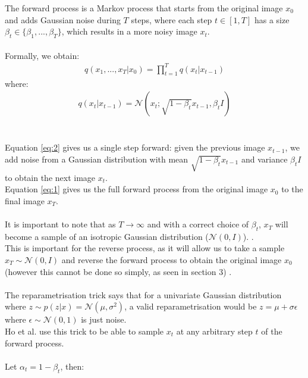 \documentclass{article}
\begin{document}
The forward process is a Markov process that starts from the original image $x_0$ and adds Gaussian noise during $T$ steps, where each step $t \in \left[1, T\right]$ has a size $\beta_t \in \{ \beta_1, ..., \beta_T \}$, which results in a more noisy image $x_t$. \cite{ho2020denoising}
\\\\
Formally, we obtain:
\begin{align}
  q\left(x_{1},..., x_{T} | x_0\right) = \prod_{t = 1}^T{q\left(x_t | x_{t - 1}\right)} \label{eq:1}
\end{align}
where:
\begin{align}
  q\left(x_t | x_{t-1}\right) = \mathcal{N}\left(x_t; \sqrt{1 - \beta_t}x_{t-1}, \beta_t I\right) \label{eq:2}
\end{align}
\\\\
Equation \ref{eq:2} gives us a single step forward: given the previous image $x_{t-1}$, we add noise from a Gaussian distribution with mean $\sqrt{1 - \beta_t}x_{t-1}$ and variance $\beta_t I$ to obtain the next image $x_t$. \\
Equation \ref{eq:1} gives us the full forward process from the original image $x_0$ to the final image $x_T$.
\\\\
It is important to note that as $T \rightarrow \infty$ and with a correct choice of $\beta_t$,  $x_T$ will become a sample of an isotropic Gaussian distribution ($\mathcal{N}\left(0, I\right)$). \cite{nichol2021improved} \cite{sohldickstein2015deep}. \\
This is important for the reverse process, as it will allow us to take a sample $x_T \sim \mathcal{N}\left(0, I\right)$ and reverse the forward process to obtain the original image $x_0$ (however this cannot be done so simply, as seen in section 3) \cite{nichol2021improved}.
\\\\
The reparametrisation trick says that for a univariate Gaussian distribution where $z \sim p\left(z | x\right) = \mathcal{N}\left(\mu, \sigma^2\right)$, a valid reparametrisation would be $z = \mu + \sigma \epsilon$ where $\epsilon \sim \mathcal{N}\left(0, 1\right)$ is just noise. \cite{kingma2022autoencoding} \\
Ho et al. \cite{ho2020denoising} use this trick to be able to sample $x_t$ at any arbitrary step $t$ of the forward process.
\\\\
Let $\alpha_t = 1 - \beta_t$, then:
\end{document}
